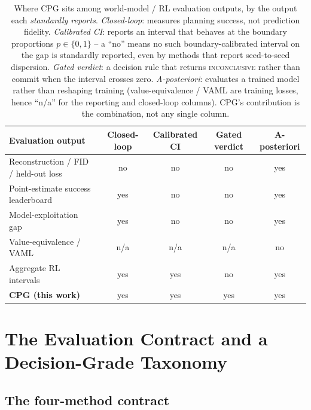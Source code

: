 \documentclass[10pt,letterpaper]{article}
\begin{document}
\begin{table}[t]
\centering
\small
\setlength{\tabcolsep}{5pt}
\begin{tabular}{lcccc}
\toprule
Evaluation output & Closed-loop & Calibrated CI & Gated verdict & A-posteriori \\
\midrule
Reconstruction / FID / held-out loss & no & no & no & yes \\
Point-estimate success leaderboard & yes & no & no & yes \\
Model-exploitation gap~\citep{yu2020mopo,kidambi2020morel} & yes & no & no & yes \\
Value-equivalence / VAML~\citep{grimm2020value,grimm2021proper,farahmand2017value} & n/a & n/a & n/a & no \\
Aggregate RL intervals~\citep{agarwal2021precipice} & yes & yes & no & yes \\
\textbf{CPG (this work)} & yes & yes & yes & yes \\
\bottomrule
\end{tabular}
\caption{Where CPG sits among world-model / RL evaluation outputs, by the output each \emph{standardly reports}. \emph{Closed-loop}: measures planning success, not prediction fidelity. \emph{Calibrated CI}: reports an interval that behaves at the boundary proportions $p \in \{0,1\}$ -- a ``no'' means no such boundary-calibrated interval on the gap is standardly reported, even by methods that report seed-to-seed dispersion. \emph{Gated verdict}: a decision rule that returns \textsc{inconclusive} rather than commit when the interval crosses zero. \emph{A-posteriori}: evaluates a trained model rather than reshaping training (value-equivalence / VAML are training losses, hence ``n/a'' for the reporting and closed-loop columns). CPG's contribution is the combination, not any single column.}
\label{tab:positioning}
\end{table}

\section{The Evaluation Contract and a Decision-Grade Taxonomy}
\label{sec:framework}

\subsection{The four-method contract}
\end{document}
